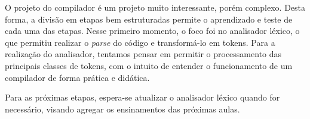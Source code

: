 
O projeto do compilador é um projeto muito interessante, porém complexo. Desta forma, a divisão em etapas bem estruturadas permite o aprendizado e teste de cada uma das etapas. Nesse primeiro momento, o foco foi no analisador léxico, o que permitiu realizar o \emph{parse} do código e transformá-lo em tokens. Para a realização do analisador, tentamos pensar em permitir o processamento das principais classes de tokens, com o intuito de entender o funcionamento de um compilador de forma prática e didática.

Para as próximas etapas, espera-se atualizar o analisador léxico quando for necessário, visando agregar os ensinamentos das próximas aulas.
